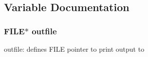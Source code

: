 \subsection{Variable Documentation}
\subsubsection{\setlength{\rightskip}{0pt plus 5cm}FILE$\ast$ {\bf outfile}\hspace{0.3cm}{\tt  [static]}}\label{cmml-fix_8c_a1}


outfile: defines FILE pointer to print output to 